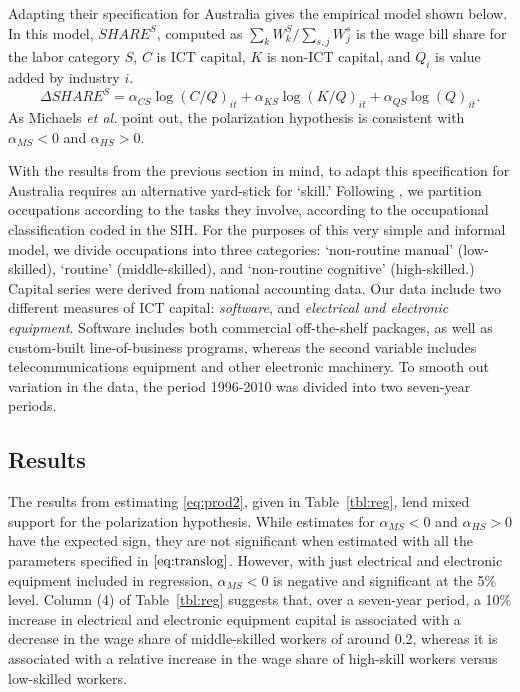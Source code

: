 Adapting their specification for Australia gives the empirical model shown below. In this model, $SHARE^S$, computed as ${\sum_k W^S_k/\sum_{s,j}W^s_j}$ is the wage bill share for the labor category $S$, $C$ is ICT capital, $K$ is non-ICT capital, and $Q_i$ is value added by industry $i$. 
\begin{equation} \label{eq:translog}
\Delta SHARE^S = \alpha_{CS}\log(C/Q)_{it} + \alpha_{KS}\log(K/Q)_{it} + \alpha_{QS}\log(Q)_{it}.
\end{equation}
As Michaels {\it et al.} point out, the polarization hypothesis is consistent with $\alpha_{MS}<0$ and $\alpha_{HS}>0$.

With the results from the previous section in mind, to adapt this specification for Australia requires an alternative yard-stick for `skill.' Following \citet{Levy2003}, we partition occupations according to the tasks they involve, according to the occupational classification coded in the SIH. For the purposes of this very simple and informal model, we divide occupations into three categories: `non-routine manual' (low-skilled), `routine' (middle-skilled), and `non-routine cognitive' (high-skilled.) Capital series were derived from national accounting data. Our data include two different measures of ICT capital: {\em software}, and {\em electrical and electronic equipment}. Software includes both commercial off-the-shelf packages, as well as custom-built line-of-business programs, whereas the second variable includes telecommunications equipment and other electronic machinery. To smooth out variation in the data, the  period 1996-2010 was divided into two seven-year periods.

\subsection{Results}

The results from estimating \eqref{eq:prod2}, given in Table~\ref{tbl:reg}, lend mixed support for the polarization hypothesis. While estimates for $\alpha_{MS}<0$ and $\alpha_{HS}>0$ have the expected sign, they are not significant when estimated with all the parameters specified in $\eqref{eq:translog}$. However, with just electrical and electronic equipment included in regression, $\alpha_{MS}<0$ is negative and significant at the 5\% level. Column (4) of Table~\ref{tbl:reg} suggests that, over a seven-year period, a 10\% increase in electrical and electronic equipment capital is associated with a decrease in the wage share of middle-skilled workers of around 0.2, whereas it is associated with a relative increase in the wage share of high-skill workers versus low-skilled workers.


